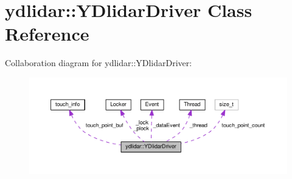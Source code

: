 \hypertarget{classydlidar_1_1_y_dlidar_driver}{}\section{ydlidar\+:\+:Y\+Dlidar\+Driver Class Reference}
\label{classydlidar_1_1_y_dlidar_driver}


Collaboration diagram for ydlidar\+:\+:Y\+Dlidar\+Driver\+:\nopagebreak
\begin{figure}[H]
\begin{center}
\leavevmode
\includegraphics[width=350pt]{classydlidar_1_1_y_dlidar_driver__coll__graph}
\end{center}
\end{figure}
